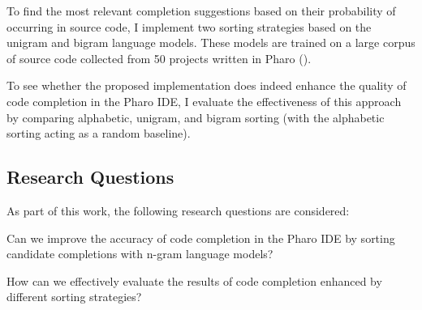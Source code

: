 To find the most relevant completion suggestions based on their probability of occurring in source code, I implement two sorting strategies based on the unigram and bigram language models. These models are trained on a large corpus of source code collected from 50 projects written in Pharo (\cite{Zait20a}).

To see whether the proposed implementation does indeed enhance the quality of code completion in the Pharo IDE, I evaluate the effectiveness of this approach by comparing alphabetic, unigram, and bigram sorting (with the alphabetic sorting acting as a random baseline).

\subsection{Research Questions}
As part of this work, the following research questions are considered:
\begin{RQ}
    \item Can we improve the accuracy of code completion in the Pharo IDE by sorting candidate completions with n-gram language models?
    \item How can we effectively evaluate the results of code completion enhanced by different sorting strategies?
\end{RQ}

